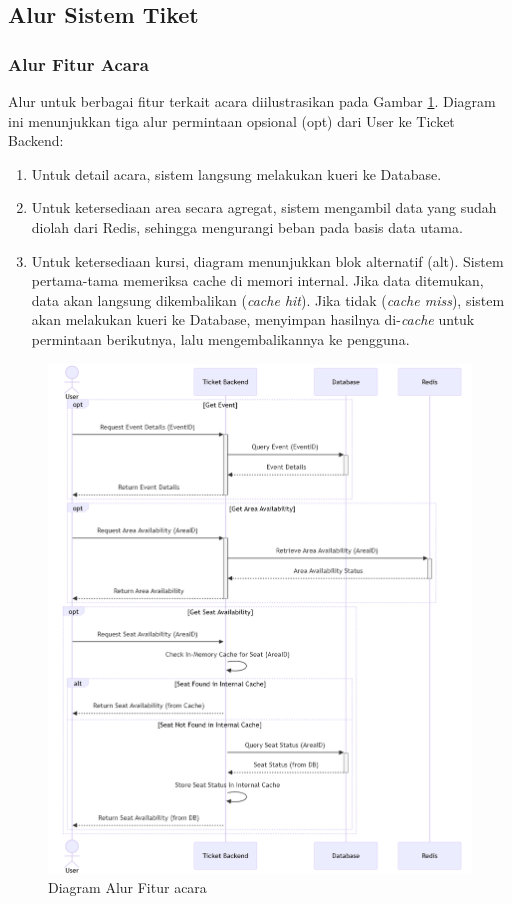 \subsection{Alur Sistem Tiket}

\subsubsection{Alur Fitur Acara}

Alur untuk berbagai fitur terkait acara diilustrasikan pada Gambar \ref{fig:flow-event}. Diagram ini menunjukkan tiga alur permintaan opsional (opt) dari User ke Ticket Backend:

\begin{enumerate}
    \item Untuk detail acara, sistem langsung melakukan kueri ke Database.
    \item Untuk ketersediaan area secara agregat, sistem mengambil data yang sudah diolah dari Redis, sehingga mengurangi beban pada basis data utama.
    \item Untuk ketersediaan kursi, diagram menunjukkan blok alternatif (alt). Sistem pertama-tama memeriksa cache di memori internal. Jika data ditemukan, data akan langsung dikembalikan (\textit{cache hit}). Jika tidak (\textit{cache miss}), sistem akan melakukan kueri ke Database, menyimpan hasilnya di-\textit{cache} untuk permintaan berikutnya, lalu mengembalikannya ke pengguna.
\end{enumerate}

\begin{figure}[H]
    \centering
    \includegraphics[width=1\textwidth]{resources/chapter-3/event-flow.png}
    \caption{Diagram Alur Fitur acara}
    \label{fig:flow-event}
\end{figure}

